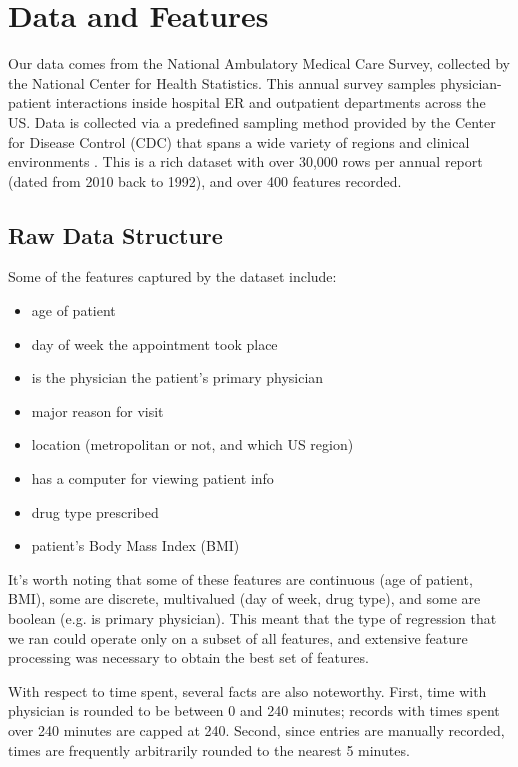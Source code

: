 \documentclass[english]{article}
\begin{document}
\section{Data and Features}

Our data comes from the National Ambulatory Medical Care Survey, collected by the National Center for Health Statistics.
This annual survey samples physician-patient interactions inside hospital ER and outpatient departments across the US.
Data is collected via a predefined sampling method provided by the Center for Disease Control (CDC) that spans a wide variety of regions and clinical environments \cite{namcs2009, namcs2010}.
This is a rich dataset with over 30,000 rows per annual report (dated from 2010 back to 1992), and over 400 features recorded.

\subsection{Raw Data Structure}

Some of the features captured by the dataset include:

\begin{itemize}[noitemsep,nolistsep]
  \item age of patient
  \item day of week the appointment took place
  \item is the physician the patient's primary physician
  \item major reason for visit
  \item location (metropolitan or not, and which US region)
  \item has a computer for viewing patient info
  \item drug type prescribed
  \item patient's Body Mass Index (BMI)
\end{itemize}

It's worth noting that some of these features are continuous (age of patient, BMI), some are discrete, multivalued (day of week, drug type), and some are boolean (e.g. is primary physician).
This meant that the type of regression that we ran could operate only on a subset of all features, and extensive feature processing was necessary to obtain the best set of features.

With respect to time spent, several facts are also noteworthy.
First, time with physician is rounded to be between 0 and 240 minutes; records with times spent over 240 minutes are capped at 240.
Second, since entries are manually recorded, times are frequently arbitrarily rounded to the nearest 5 minutes.
\end{document}
